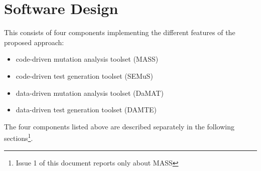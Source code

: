 
\chapter{Software Design}

This \FAQAS consists of four components implementing the different features of the proposed approach:
\begin{itemize}
	\item code-driven mutation analysis toolset (MASS)
	\item code-driven test generation toolset (SEMuS)
	\item data-driven mutation analysis toolset (DaMAT)
	\item data-driven test generation toolset (DAMTE)
\end{itemize}

The four components listed above are described separately in the following sections\footnote{Issue 1 of this document reports only about MASS}.


